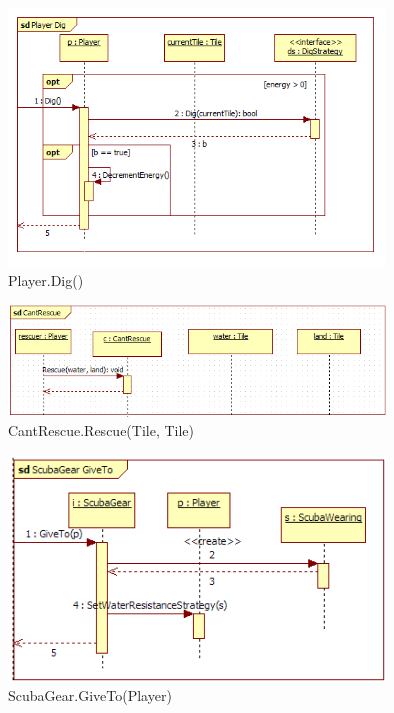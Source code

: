 \begin{figure}[H]
	\begin{center}
		\includegraphics[width=10cm]{chapters/chapter03/seqdiag/Player_Dig.png}
		\caption{Player.Dig()}
		\label{fig:PlayerDig}
	\end{center}
\end{figure}
\begin{figure}[H]
	\begin{center}
		\includegraphics[width=10cm]{chapters/chapter03/seqdiag/CantRescue_Rescue.png}
		\caption{CantRescue.Rescue(Tile, Tile)}
		\label{fig:CantRescueRescue}
	\end{center}
\end{figure}
\begin{figure}[H]
	\begin{center}
		\includegraphics[width=10cm]{chapters/chapter03/seqdiag/ScubaGear_GiveTo.png}
		\caption{ScubaGear.GiveTo(Player)}
		\label{fig:ScubaGearGiveTo}
	\end{center}
\end{figure}

